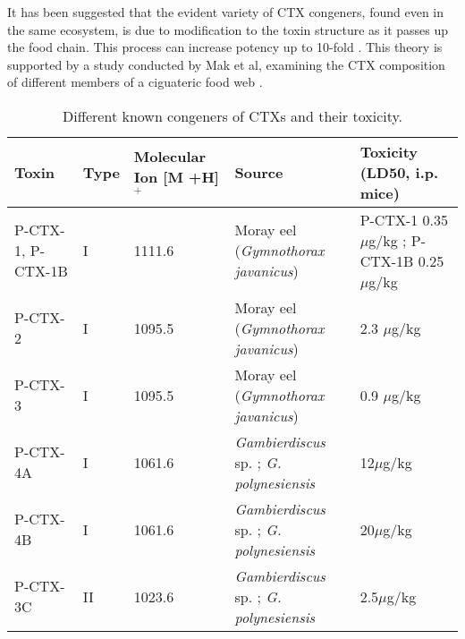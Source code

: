 \documentclass[12pt]{article}
\begin{document}
It has been suggested that the evident variety of CTX congeners, found even in the same ecosystem, is due to modification to the toxin structure as it passes up the food chain. This process can increase potency up to 10-fold \cite{hokama1996human,lewis2006ciguatera}. This theory is supported by a study conducted by Mak et al, examining the CTX composition of different members of a ciguateric food web \cite{mak2013pacific}.


\begin{table}
\caption{Different known congeners of CTXs and their toxicity.}
\label{tbl:CTXTable}
\begin{tabular}{  | p{2cm} | p{1.5cm} | p{2.5cm} | p{4cm} | p{4cm} |}
\hline
\textbf{Toxin} & \textbf{Type} & \textbf{Molecular Ion [M +H]$^{+}$} & \textbf{Source} & \textbf{Toxicity (LD50, i.p. mice)} \\
\hline
P-CTX-1, P-CTX-1B & I & 1111.6 & Moray eel (\emph{Gymnothorax javanicus}) \cite{murata1990structures,lewis1991purification} & P-CTX-1 0.35 $\mu$g/kg \cite{murata1990structures}; P-CTX-1B 0.25$\mu$g/kg \cite{lewis1991purification} \\
\hline
P-CTX-2 & I & 1095.5 \cite{lewis1991purification} & Moray eel (\emph{Gymnothorax javanicus}) \cite{lewis1991purification} & 2.3 $\mu$g/kg \cite{lewis1991purification} \\
\hline
 P-CTX-3 & I & 1095.5 \cite{lewis1991purification} & Moray eel (\emph{Gymnothorax javanicus}) \cite{lewis1991purification} & 0.9 $\mu$g/kg \cite{lewis1991purification} \\
 \hline
 P-CTX-4A & I & 1061.6 \cite{yasumoto2000structural} & \emph{Gambierdiscus} sp. \cite{yasumoto2000structural}; \emph{G. polynesiensis} \cite{chinain2010growth} & 12$\mu$g/kg \cite{chinain2010growth} \\
 \hline
 P-CTX-4B & I & 1061.6 \cite{yasumoto2000structural} & \emph{Gambierdiscus} sp. \cite{yasumoto2000structural}; \emph{G. polynesiensis} \cite{chinain2010growth} & 20$\mu$g/kg \cite{chinain2010growth}\\
 \hline
 P-CTX-3C & II & 1023.6 \cite{satake1993structure} &  \emph{Gambierdiscus} sp. \cite{satake1993structure}; \emph{G. polynesiensis} \cite{chinain2010growth} & 2.5$\mu$g/kg \cite{chinain2010growth}\\

\end{tabular}
\end{table}
\end{document}
